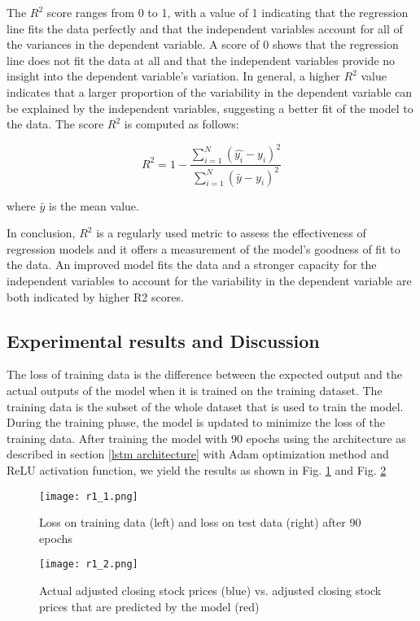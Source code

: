 \documentclass[a4paper]{article}
\begin{document}
The $R^2$ score ranges from 0 to 1, with a value of 1 indicating that the regression line fits the data perfectly and that the independent variables account for all of the variances in the dependent variable. A score of 0 shows that the regression line does not fit the data at all and that the independent variables provide no insight into the dependent variable's variation. In general, a higher $R^2$ value indicates that a larger proportion of the variability in the dependent variable can be explained by the independent variables, suggesting a better fit of the model to the data. The score $R^2$ is computed as follows:

$$
R^2 = 1 - \frac{\sum_{i=1}^{N}{(\hat{y_i}-y_i)^2}}{\sum_{i=1}^{N}{(\bar{y}-y_i)^2}}
$$

where $\bar{y}$ is the mean value.

In conclusion, $R^2$ is a regularly used metric to assess the effectiveness of regression models and it offers a measurement of the model's goodness of fit to the data. An improved model fits the data and a stronger capacity for the independent variables to account for the variability in the dependent variable are both indicated by higher R2 scores.
\subsection{Experimental results and Discussion} \label{results}

The loss of training data is the difference between the expected output and the actual outputs of the model when it is trained on the training dataset. The training data is the subset of the whole dataset that is used to train the model. During the training phase, the model is updated to minimize the loss of the training data. After training the model with 90 epochs using the architecture as described in section \ref{lstm architecture} with Adam optimization method and ReLU activation function, we yield the results as shown in Fig. \ref{fig:loss1} and Fig. \ref{fig:loss2}

\begin{figure}[!h]
    \centering
    \texttt{[image: r1\_1.png]}
    \caption{Loss on training data (left) and loss on test data (right) after 90 epochs}
    \label{fig:loss1}
\end{figure}

\begin{figure}[!h]
    \centering
    \texttt{[image: r1\_2.png]}
    \caption{Actual adjusted closing stock prices (blue) vs. adjusted closing stock prices that are predicted by the model (red)}
    \label{fig:loss2}
\end{figure}
\end{document}
